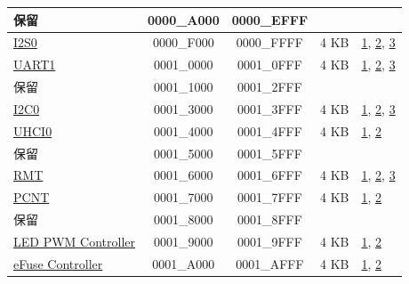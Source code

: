 \begin{longtable}[c]{ |p{5.0cm}|c|c|r|p{1.5cm}| }
    \rowcolor{gray!25}
   保留  & \hexprefix{}0000\_A000 & \hexprefix{}0000\_EFFF &        &                  \\\hline
             \hyperref[mod:i2s]{I2S0}      & \hexprefix{}0000\_F000 & \hexprefix{}0000\_FFFF &   4 KB    & \hyperref[PAM footnote: 1]{1}, \hyperref[PAM footnote: 2]{2}, \hyperref[PAM footnote: 3]{3}  \\\hline

              \hyperref[mod:uart]{UART1}     & \hexprefix{}0001\_0000 & \hexprefix{}0001\_0FFF &   4 KB   & \hyperref[PAM footnote: 1]{1}, \hyperref[PAM footnote: 2]{2}, \hyperref[PAM footnote: 3]{3}  \\\hline

    \rowcolor{gray!25}
  保留  & \hexprefix{}0001\_1000 & \hexprefix{}0001\_2FFF &        &                 \\\hline
           \hyperref[mod:i2c]{I2C0}        & \hexprefix{}0001\_3000 & \hexprefix{}0001\_3FFF &   4 KB & \hyperref[PAM footnote: 1]{1}, \hyperref[PAM footnote: 2]{2}, \hyperref[PAM footnote: 3]{3}  \\\hline
               \hyperref[mod:uart]{UHCI0}    & \hexprefix{}0001\_4000 & \hexprefix{}0001\_4FFF &   4 KB  & \hyperref[PAM footnote: 1]{1}, \hyperref[PAM footnote: 2]{2}     \\\hline

    \rowcolor{gray!25}
 保留     & \hexprefix{}0001\_5000 & \hexprefix{}0001\_5FFF &        &               \\\hline
              \hyperref[mod:rmt]{RMT}      & \hexprefix{}0001\_6000 & \hexprefix{}0001\_6FFF &   4 KB  & \hyperref[PAM footnote: 1]{1}, \hyperref[PAM footnote: 2]{2}, \hyperref[PAM footnote: 3]{3}  \\\hline
               \hyperref[mod:pcnt]{PCNT}    & \hexprefix{}0001\_7000 & \hexprefix{}0001\_7FFF &   4 KB  & \hyperref[PAM footnote: 1]{1}, \hyperref[PAM footnote: 2]{2}     \\\hline

    \rowcolor{gray!25}
  保留   & \hexprefix{}0001\_8000 & \hexprefix{}0001\_8FFF &        &               \\\hline
             \hyperref[mod:ledpwm]{LED PWM Controller}     & \hexprefix{}0001\_9000 & \hexprefix{}0001\_9FFF &   4 KB    & \hyperref[PAM footnote: 1]{1}, \hyperref[PAM footnote: 2]{2}     \\\hline
            \hyperref[mod:efuse]{eFuse Controller}       & \hexprefix{}0001\_A000 & \hexprefix{}0001\_AFFF &   4 KB  & \hyperref[PAM footnote: 1]{1}, \hyperref[PAM footnote: 2]{2}     \\\hline


\end{longtable}
